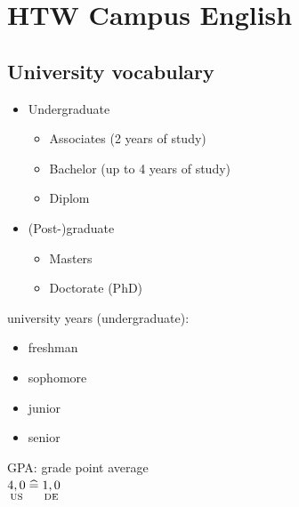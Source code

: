 






\maketitle
\newpage
\tableofcontents
\newpage

\section{HTW Campus English}

\subsection*{University vocabulary}
\begin{itemize}
\item Undergraduate
\begin{itemize}[label=$\rightarrow$]
\item Associates (2 years of study)
\item Bachelor (up to 4 years of study)
\item Diplom
\end{itemize}
\item (Post-)graduate
\begin{itemize}[label=$\rightarrow$]
\item Masters
\item Doctorate (PhD)
\end{itemize}
\end{itemize}
university years (undergraduate):
\begin{itemize}
\item freshman
\item sophomore
\item junior
\item senior
\end{itemize}
GPA: grade point average\\
$\underset{\text{US}}{4,0}\;\widehat{=}\; \underset{\text{DE}}{1,0} $
